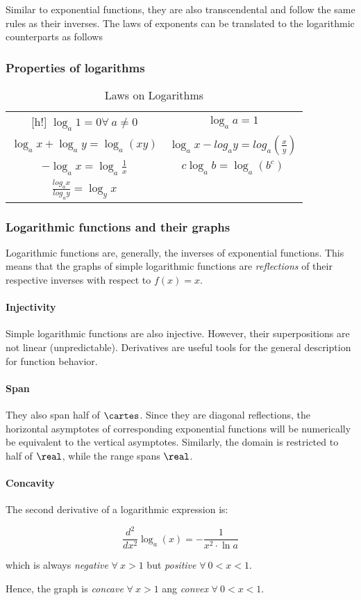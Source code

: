 Similar to exponential functions, they are also transcendental and follow the same rules as their inverses.
The laws of exponents can be translated to the logarithmic counterparts as follows

\subsubsection{Properties of logarithms}

\begin{table}
  \centering
  \caption{Laws on Logarithms}

  \begin{tabular}{c|c}[h!]
    $\log_a 1 = 0 \forall\ a \neq 0$ & $\log_a a = 1$ \\
    $\log_a x + \log_a y = \log_a (xy)$ & $\log_a x - log_a y = log_a (\frac{x}{y})$ \\
    $-\log_a x = \log_a \frac{1}{x}$ & $c\log_a b = \log_a (b^c)$ \\
    $\frac{log_a x}{log_a y} = \log_y x$
  \end{tabular}

\end{table}

\subsubsection{Logarithmic functions and their graphs}

Logarithmic functions are, generally, the inverses of exponential functions.
This means that the graphs of simple logarithmic functions are \emph{reflections} of their respective inverses with respect to $f(x) = x$.

\paragraph{Injectivity} Simple logarithmic functions are also injective.
However, their superpositions are not linear (unpredictable).
Derivatives are useful tools for the general description for function behavior.

\paragraph{Span} They also span half of $\cartes$.
Since they are diagonal reflections, the horizontal asymptotes of corresponding exponential functions will be numerically be equivalent to the vertical asymptotes.
Similarly, the domain is restricted to half of $\real$, while the range spans $\real$.

\paragraph{Concavity}
The second derivative of a logarithmic expression is:

$$\frac{d^2}{dx^2} \log_a (x) = -\frac{1}{x^2 \cdot \ln{a}}$$

which is always \emph{negative} $\forall\ x > 1$ but \emph{positive} $\forall\ 0 < x < 1$.

Hence, the graph is \emph{concave} $\forall\ x > 1$ ang \emph{convex} $\forall\ 0 < x < 1$.
